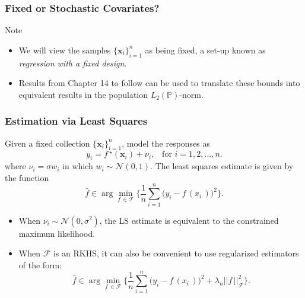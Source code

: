 \documentclass[11pt]{beamer}
\newcommand{\Prob}{\mathbb{P}}
\newcommand{\bx}{\mathbf{x}}
\newcommand{\cF}{\mathcal{F}}
\newcommand{\fstar}{f\,^\star}
\newcommand{\fhat}{\widehat{f}}
\begin{document}
	
	\begin{frame}
		\frametitle{Fixed or Stochastic Covariates?}
		\begin{block}{Note}
			\begin{itemize}
				\item We will view the samples $\{\bx_i\}_{i = 1}^n$
				as being fixed, a set-up known as \textit{regression with a fixed design}.
				\item Results from Chapter 14 to follow can be used to translate these bounds into equivalent results in the population $L_2(\Prob)$-norm.
			\end{itemize} 
		\end{block}		
	\end{frame}

	\begin{frame}
	\frametitle{Estimation via Least Squares}	
		Given a fixed collection $\{\bx_i\}_{i = 1}^n$, model the responses as 		
		\begin{equation*}
			y_i = \fstar (\bx_i) + \nu_i, \;\;\; \text{for } i = 1, 2, \dots, n.
		\end{equation*}
		where $\nu_i = \sigma w_i$ in which  $w_i \sim \mathcal{N}(0, 1)$. The least squares estimate is given by the function
		\begin{equation*}
		\fhat \in \arg\min_{f\,\in\cF} \Bigg\{\frac{1}{n} \sum_{i = 1}^{n} \big(y_i - f\,(x_i\,)\big)^2\Bigg\}.
		\end{equation*}
		
		\begin{itemize}
			\item When $\nu_i \sim \mathcal{N}(0,\sigma^2)$, the LS estimate is equivalent to the constrained maximum likelihood.
			
			\item When $\cF$ is an RKHS, it can also be convenient to use regularized estimators of the form:			
			\begin{equation*}
			\fhat \in \arg\min_{f\,\in\cF} \Bigg\{\frac{1}{n} \sum_{i = 1}^{n} \big(y_i - f\,(x_i\,)\big)^2 + \lambda_n ||f\,||_\cF^2\Bigg\}.
			\end{equation*}
		\end{itemize}
	\end{frame}
\end{document}
